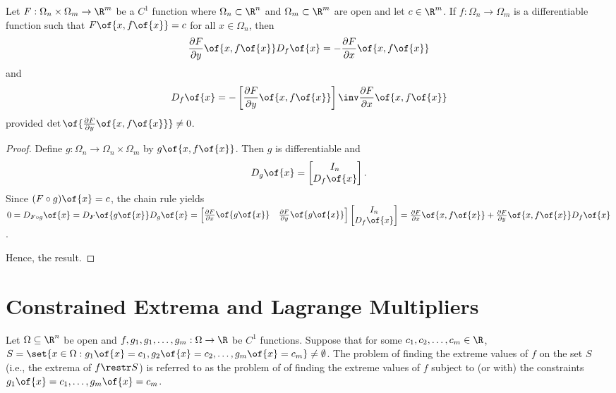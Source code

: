 \begin{proposition}
    Let $F: \Omega_n \times \Omega_m \to \R^m$ be a $C^1$ function where $\Omega_n \subset \R^n$ and $\Omega_m \subset \R^m$ are open and let $c \in \R^m$. If $f: \Omega_n \to \Omega_m$ is a differentiable function such that $F\of{x, f\of{x}} = c$ for all $x \in \Omega_n$, then
    \[\frac{\partial F}{\partial y}\of{x, f\of{x}} D_f\of{x} = -\frac{\partial F}{\partial x}\of{x, f\of{x}}\]
    and
    \[D_f\of{x} = -\left[\frac{\partial F}{\partial y}\of{x, f\of{x}}\right]\inv \frac{\partial F}{\partial x}\of{x, f\of{x}}\]
    provided $\det \of{\frac{\partial F}{\partial y}\of{x, f\of{x}}} \neq 0$.
\end{proposition}
\begin{proof}
    Define $g: \Omega_n \to \Omega_n \times \Omega_m$ by $g\of{x, f\of{x}}$. Then $g$ is differentiable and 
    \[D_g \of{x} = \begin{bmatrix} I_n \\ D_f\of{x} \end{bmatrix}.\]
    Since $(F \circ g)\of{x} = c$, the chain rule yields $0 = D_{F \circ g}\of{x} = D_F\of{g\of{x}} D_g\of{x} = \begin{bmatrix} \frac{\partial F}{\partial x}\of{g\of{x}} & \frac{\partial F}{\partial y}\of{g\of{x}} \end{bmatrix} \begin{bmatrix} I_n \\ D_f\of{x} \end{bmatrix} = \frac{\partial F}{\partial x}\of{x, f\of{x}} + \frac{\partial F}{\partial y}\of{x, f\of{x}} D_f\of{x}$.

    Hence, the result.
\end{proof}

\section{Constrained Extrema and Lagrange Multipliers}

Let $\Omega \subseteq \R^n$ be open and $f, g_1, g_1, \dots, g_m: \Omega \to \R$ be $C^1$ functions. Suppose that for some $c_1, c_2, \dots, c_m \in \R$, $S = \set{x \in \Omega: g_1\of{x} = c_1, g_2\of{x} = c_2, \dots, g_m\of{x} = c_m} \neq \emptyset$. The problem of finding the extreme values of $f$ on the set $S$ (i.e., the extrema of $f \restr S$) is referred to as the problem of of finding the extreme values of $f$ subject to (or with) the constraints $g_1\of{x} = c_1, \dots, g_m\of{x} = c_m$.

